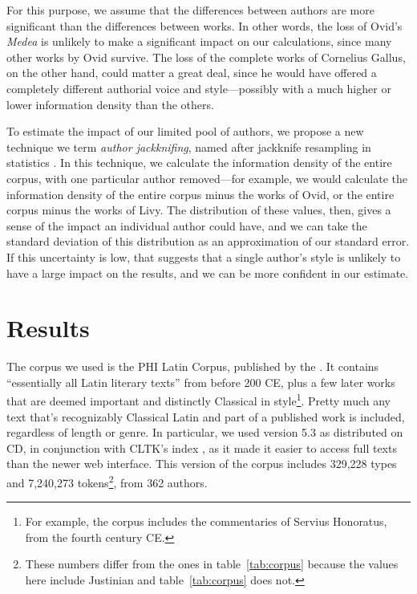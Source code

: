 \documentclass[12pt,twoside]{article}
\begin{document}
For this purpose, we assume that the differences between authors are more significant than the differences between works. In other words, the loss of Ovid's \emph{Medea} is unlikely to make a significant impact on our calculations, since many other works by Ovid survive. The loss of the complete works of Cornelius Gallus, on the other hand, could matter a great deal, since he would have offered a completely different authorial voice and style---possibly with a much higher or lower information density than the others.

To estimate the impact of our limited pool of authors, we propose a new technique we term \emph{author jackknifing}, named after jackknife resampling in statistics \citep{efron}. In this technique, we calculate the information density of the entire corpus, with one particular author removed---for example, we would calculate the information density of the entire corpus minus the works of Ovid, or the entire corpus minus the works of Livy. The distribution of these values, then, gives a sense of the impact an individual author could have, and we can take the standard deviation of this distribution as an approximation of our standard error. If this uncertainty is low, that suggests that a single author's style is unlikely to have a large impact on the results, and we can be more confident in our estimate.

\section{Results}
\label{sec:res}

The corpus we used is the PHI Latin Corpus, published by the \citet{phi}. It contains ``essentially all Latin literary texts'' from before 200 CE, plus a few later works that are deemed important and distinctly Classical in style\footnote{For example, the corpus includes the commentaries of Servius Honoratus, from the fourth century CE.}. Pretty much any text that's recognizably Classical Latin and part of a published work is included, regardless of length or genre. In particular, we used version 5.3 as distributed on CD, in conjunction with CLTK's index \citep{cltk}, as it made it easier to access full texts than the newer web interface. This version of the corpus includes 329,228 types and 7,240,273 tokens\footnote{These numbers differ from the ones in table~\ref{tab:corpus} because the values here include Justinian and table~\ref{tab:corpus} does not.}, from 362 authors.
\end{document}
